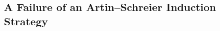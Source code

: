 \documentclass[11pt]{report}
\begin{document}




\begin{appendices}


\chapter{A Failure of an Artin--Schreier Induction Strategy}
\label{appendix:artin_schreier_induction_failure}
\label{section:a_wrong_path}

\end{appendices}
\printbibliography
\end{document}
